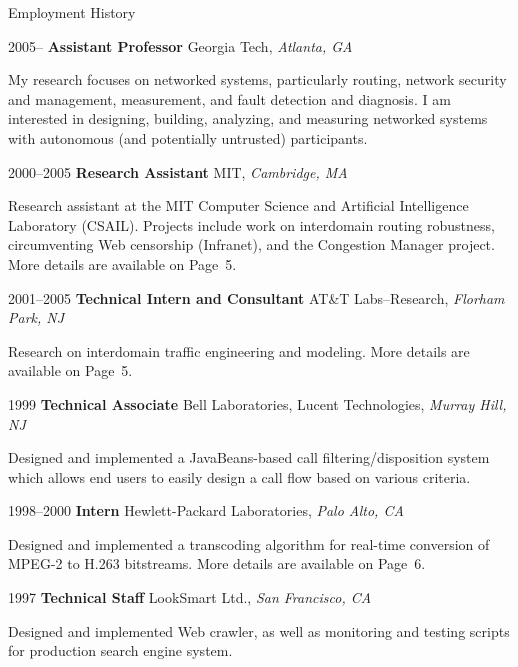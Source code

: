 \documentclass{article}
\begin{document}
\begin{cv}{}
\begin{cvlist}{Employment History}
 \item [2005--] \textbf{Assistant Professor} \hfill Georgia Tech, {\em
 Atlanta, GA}

My research focuses on networked systems, particularly routing,
network security and management, measurement, and fault detection and
diagnosis. I am interested in designing, building, analyzing, and
measuring networked systems with autonomous (and potentially untrusted)
participants.

  \item[2000--2005] \textbf{Research Assistant} \hfill MIT, {\em Cambridge, MA}

Research assistant at the MIT Computer Science and Artificial
Intelligence Laboratory (CSAIL).  Projects include work on interdomain
routing robustness, circumventing Web censorship (Infranet), and the
Congestion Manager project.  More details are available on Page~5.

\item [2001--2005] \textbf {Technical Intern and Consultant} \hfill AT\&T
  Labs--Research, {\em Florham Park, NJ}

Research on interdomain traffic engineering and modeling.
More details are available on Page~5.
\\

\item [1999] \textbf {Technical Associate} \hfill Bell Laboratories,
  Lucent Technologies, {\em Murray Hill, NJ}

Designed and implemented a JavaBeans-based call filtering/disposition
system which allows end users to easily design a call flow based on
various criteria.

\item [1998--2000] \textbf {Intern} \hfill Hewlett-Packard Laboratories,
  {\em Palo Alto, CA}

Designed and implemented a transcoding algorithm
for real-time conversion of MPEG-2 to H.263 bitstreams.  More details are
available on Page~6.

\item [1997] \textbf{Technical Staff} \hfill LookSmart Ltd., {\em
  San Francisco, CA}

Designed and implemented Web crawler, as well as monitoring and
testing scripts for production search engine system.

\end{cvlist}


\end{cv}
\end{document}
